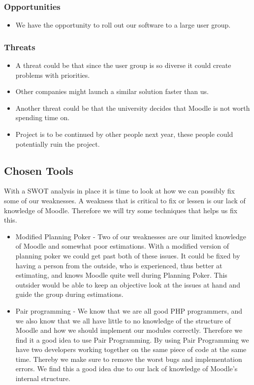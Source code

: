 \subsubsection{Opportunities}
\begin{itemize}
    \item We have the opportunity to roll out our software to a large user group.    
\end{itemize}

\subsubsection{Threats}
\begin{itemize}
    \item A threat could be that since the user group is so diverse it could create problems with priorities.
    \item Other companies might launch a similar solution faster than us.
    \item Another threat could be that the university decides that Moodle is not worth spending time on.
    \item Project is to be continued by other people next year, these people could potentially ruin the project.
\end{itemize}

\subsection{Chosen Tools}
With a SWOT analysis in place it is time to look at how we can possibly fix some of our weaknesses. A weakness that is critical to fix or lessen is our lack of knowledge of Moodle. Therefore we will try some techniques that helps us fix this.
\begin{itemize}
    \item Modified Planning Poker - Two of our weaknesses are our limited knowledge of Moodle and somewhat poor estimations. With a modified version of planning poker we could get past both of these issues. It could be fixed by having a person from the outside, who is experienced, thus better at estimating, and knows Moodle quite well during Planning Poker. This outsider would be able to keep an objective look at the issues at hand and guide the group during estimations.
    \item Pair programming - We know that we are all good PHP programmers, and we also know that we all have little to no knowledge of the structure of Moodle and how we should implement our modules correctly. Therefore we find it a good idea to use Pair Programming. By using Pair Programming we have two developers working together on the same piece of code at the same time. Thereby we make sure to remove the worst bugs and implementation errors. We find this a good idea due to our lack of knowledge of Moodle's internal structure.
\end{itemize}

